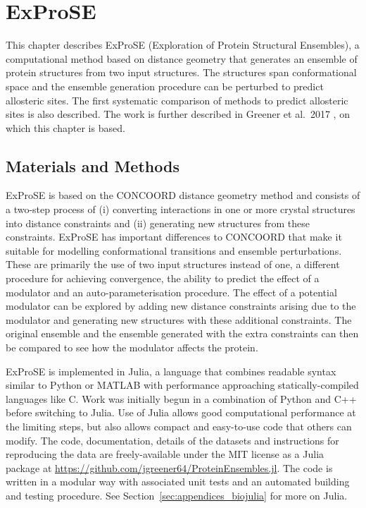\chapter{ExProSE}
\label{cha:exprose}

This chapter describes ExProSE (Exploration of Protein Structural Ensembles), a computational method based on distance geometry that generates an ensemble of protein structures from two input structures.
The structures span conformational space and the ensemble generation procedure can be perturbed to predict allosteric sites.
The first systematic comparison of methods to predict allosteric sites is also described.
The work is further described in Greener et al.\ 2017 \cite{Greener2017}, on which this chapter is based.


\section{Materials and Methods}
\label{sec:exprose_methods}

ExProSE is based on the CONCOORD distance geometry method \cite{DeGroot1997} and consists of a two-step process of (i) converting interactions in one or more crystal structures into distance constraints and (ii) generating new structures from these constraints.
ExProSE has important differences to CONCOORD that make it suitable for modelling conformational transitions and ensemble perturbations.
These are primarily the use of two input structures instead of one, a different procedure for achieving convergence, the ability to predict the effect of a modulator and an auto-parameterisation procedure.
The effect of a potential modulator can be explored by adding new distance constraints arising due to the modulator and generating new structures with these additional constraints. The original ensemble and the ensemble generated with the extra constraints can then be compared to see how the modulator affects the protein.

ExProSE is implemented in Julia, a language that combines readable syntax similar to Python or MATLAB with performance approaching statically-compiled languages like C.
Work was initially begun in a combination of Python and C++ before switching to Julia.
Use of Julia allows good computational performance at the limiting steps, but also allows compact and easy-to-use code that others can modify.
The code, documentation, details of the datasets and instructions for reproducing the data are freely-available under the MIT license as a Julia package at \url{https://github.com/jgreener64/ProteinEnsembles.jl}.
The code is written in a modular way with associated unit tests and an automated building and testing procedure.
See Section~\ref{sec:appendices_biojulia} for more on Julia.


